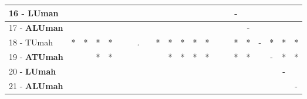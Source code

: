 \begin{table}[h]
\begin{center}
\begin{tabular}{lcc|cc|cc|cc|cc|cc|cc|cc|cc|cc|c}
16 - \textbf{LUman}	&   &   &   &   &   &   &   &   &   &   &   &   &   &   &   & - &   &   &   &   &   \\ \hline
17 - \textbf{ALUman}	&   &   &   &   &   &   &   &   &   &   &   &   &   &   &   &   & - &   &   &   &   \\
18 - TUmah	& * & * & * & * &   &   & . &   & * & * & * & * & * &   &   & * & * & - & * & * & * \\ \hline
19 - \textbf{ATUmah}	&   &   & * & * &   &   &   &   &   & * & * & * & * &   &   & * & * &   & - & * & * \\
20 - \textbf{LUmah}	&   &   &   &   &   &   &   &   &   &   &   &   &   &   &   &   &   &   &   & - &   \\ \hline
21 - \textbf{ALUmah}	&   &   &   &   &   &   &   &   &   &   &   &   &   &   &   &   &   &   &   &   & - \\\end{tabular}
\label{stratsALCKappaFriedRF}
\end{center}
\end{table}